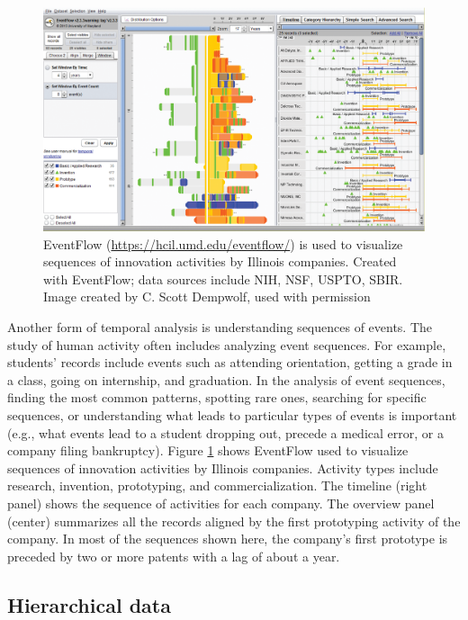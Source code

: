 \documentclass[]{krantz}
\begin{document}
\begin{figure}

{\centering \includegraphics[width=0.9\linewidth]{ChapterViz/figures/fig9-7} 

}

\caption{EventFlow (\url{https://hcil.umd.edu/eventflow/}) is used to visualize sequences of innovation activities by Illinois companies. Created with EventFlow; data sources include NIH, NSF, USPTO, SBIR. Image created by C. Scott Dempwolf, used with permission}\label{fig:fig9-7}
\end{figure}

Another form of temporal analysis is understanding sequences of events.
The study of human activity often includes analyzing event sequences.
For example, students' records include events such as attending
orientation, getting a grade in a class, going on internship, and
graduation. In the analysis of event sequences, finding the most common
patterns, spotting rare ones, searching for specific sequences, or
understanding what leads to particular types of events is important
(e.g., what events lead to a student dropping out, precede a medical
error, or a company filing bankruptcy). Figure \ref{fig:fig9-7} shows
EventFlow used to visualize sequences of innovation activities by
Illinois companies. Activity types include research, invention,
prototyping, and commercialization. The timeline (right panel) shows the
sequence of activities for each company. The overview panel (center)
summarizes all the records aligned by the first prototyping activity of
the company. In most of the sequences shown here, the company's first
prototype is preceded by two or more patents with a lag of about a year.

\hypertarget{sec:viz-2.5}{\subsection{Hierarchical
data}\label{sec:viz-2.5}}
\end{document}

